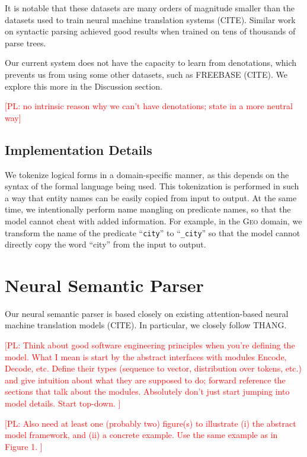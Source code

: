 \documentclass[11pt,letterpaper]{article}
\newcommand{\geo}{\textsc{Geo}\xspace}
\newcommand\pl[1]{\textcolor{red}{[PL: #1]}}
\begin{document}
It is notable that these datasets are many orders of magnitude smaller
than the datasets used to train neural machine translation systems (CITE).
Similar work on syntactic parsing achieved good results
when trained on tens of thousands of parse trees.

Our current system does not have the capacity to learn from denotations,
which prevents us from using some other datasets,
such as FREEBASE (CITE).
We explore this more in the Discussion section.

\pl{no intrinsic reason why we can't have denotations;
state in a more neutral way}

\subsection{Implementation Details}
We tokenize logical forms in a domain-specific manner,
as this depends on the syntax of the formal language being used.
This tokenization is performed in such a way that
entity names can be easily copied from input to output.
At the same time, we intentionally perform name mangling on predicate names,
so that the model cannot cheat with added information.
For example, in the \geo domain, we transform the name
of the predicate ``\texttt{city}'' to ``\texttt{\_city}''
so that the model cannot directly copy the word ``city'' from the input 
to output.

\section{Neural Semantic Parser}
Our neural semantic parser is based closely on existing
attention-based neural machine translation models (CITE).
In particular, we closely follow THANG.

\pl{
Think about good software engineering principles when you're defining the
model.  What I mean is start by the abstract interfaces
with modules Encode, Decode, etc.
Define their types (sequence to vector, distribution over tokens, etc.)
and give intuition about what they are supposed to do;
forward reference the sections that talk about the modules.
Absolutely don't just start jumping into model details.
Start top-down.
}

\pl{
  Also need at least one (probably two) figure(s)
  to illustrate (i) the abstract model framework,
  and (ii) a concrete example.  Use the same example as in Figure 1.
}
\end{document}

